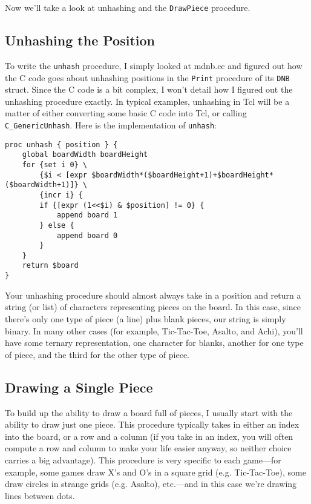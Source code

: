 \documentclass{article}
\begin{document}
Now we'll take a look at unhashing and the \texttt{DrawPiece} procedure.

\subsection{Unhashing the Position}

To write the \texttt{unhash} procedure, I simply looked at mdnb.cc and figured out how the C code goes about unhashing positions in the \texttt{Print} procedure of its \texttt{DNB} struct. Since the C code is a bit complex, I won't detail how I figured out the unhashing procedure exactly. In typical examples, unhashing in Tcl will be a matter of either converting some basic C code into Tcl, or calling \texttt{C\_GenericUnhash}. Here is the implementation of \texttt{unhash}:

\begin{verbatim}
proc unhash { position } {
    global boardWidth boardHeight
    for {set i 0} \
        {$i < [expr $boardWidth*($boardHeight+1)+$boardHeight*($boardWidth+1)]} \
        {incr i} {
        if {[expr (1<<$i) & $position] != 0} {
            append board 1
        } else {
            append board 0
        }
    }
    return $board
}
\end{verbatim}
Your unhashing procedure should almost always take in a position and return a string (or list) of characters representing pieces on the board. In this case, since there's only one type of piece (a line) plus blank pieces, our string is simply binary. In many other cases (for example, Tic-Tac-Toe, Asalto, and Achi), you'll have some ternary representation, one character for blanks, another for one type of piece, and the third for the other type of piece.

\subsection{Drawing a Single Piece}

To build up the ability to draw a board full of pieces, I usually start with the ability to draw just one piece. This procedure typically takes in either an index into the board, or a row and a column (if you take in an index, you will often compute a row and column to make your life easier anyway, so neither choice carries a big advantage). This procedure is very specific to each game---for example, some games draw X's and O's in a square grid (e.g. Tic-Tac-Toe), some draw circles in strange grids (e.g. Asalto), etc.---and in this case we're drawing lines between dots.
\end{document}
